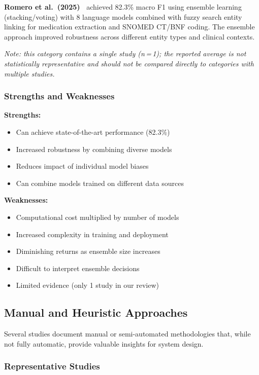 \textbf{Romero et al.~(2025)~\cite{Romero:2025}} achieved 82.3\% macro F1 using ensemble learning (stacking/voting) with 8 language models combined with fuzzy search entity linking for medication extraction and SNOMED CT/BNF coding. The ensemble approach improved robustness across different entity types and clinical contexts.

\smallskip
\noindent\textit{Note: this category contains a single study (n\,=\,1); the reported average is not statistically representative and should not be compared directly to categories with multiple studies.}

\subsubsection{Strengths and Weaknesses}

\textbf{Strengths:}
\begin{itemize}
    \item Can achieve state-of-the-art performance (82.3\%)
    \item Increased robustness by combining diverse models
    \item Reduces impact of individual model biases
    \item Can combine models trained on different data sources
\end{itemize}

\textbf{Weaknesses:}
\begin{itemize}
    \item Computational cost multiplied by number of models
    \item Increased complexity in training and deployment
    \item Diminishing returns as ensemble size increases
    \item Difficult to interpret ensemble decisions
    \item Limited evidence (only 1 study in our review)
\end{itemize}

\subsection{Manual and Heuristic Approaches}

Several studies document manual or semi-automated methodologies that, while not fully automatic, provide valuable insights for system design.

\subsubsection{Representative Studies}

